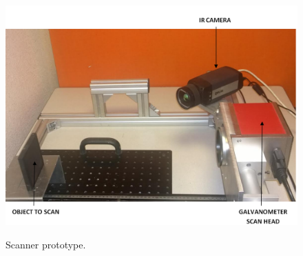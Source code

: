 \begin{figure}
  \centering
  \hspace*{\fill}
	{\includegraphics[width=0.7\linewidth]{fig4c.png}}
  \hspace*{\fill}
	
	\caption{Scanner prototype.}
  \label{fig:4}
\end{figure}
